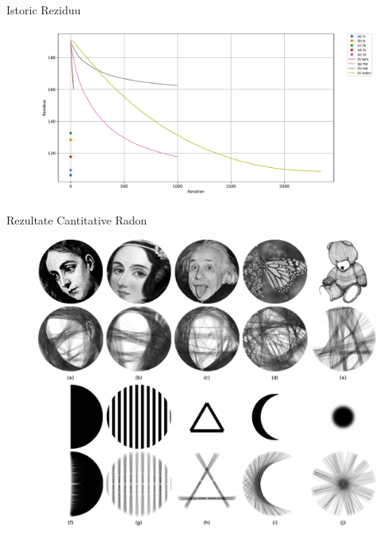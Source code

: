 \documentclass[aspectratio=169,xcolor=dvipsnames]{beamer}
\begin{document}
\begin{frame}{Istoric Reziduu}
    \begin{figure}
        \includegraphics[width=0.9\linewidth]{images/residual_history.pdf}
    \end{figure}
\end{frame}

\begin{frame}{Rezultate Cantitative Radon}
    \begin{figure}
        \includegraphics[width=0.6\linewidth]{images/radon_quantitative_test.pdf}
    \end{figure}
\end{frame}

\end{document}
